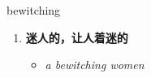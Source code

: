 
\begin{frame}
{\huge bewitching}
\begin{center}
\begin{enumerate}\Large
  \item \textbf{迷人的，让人着迷的}
  \begin{itemize}
    \item \em{\Large{a bewitching women}}
  \end{itemize}
\end{enumerate}
\end{center}
\end{frame}
